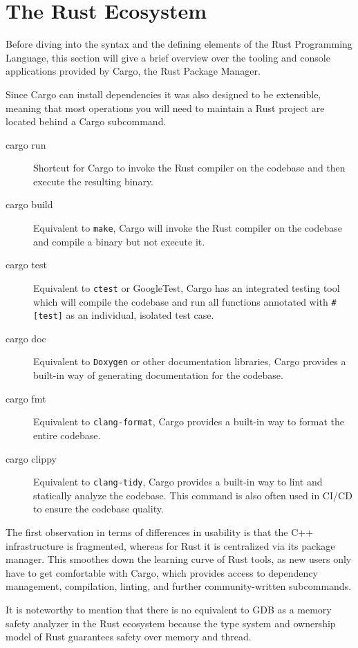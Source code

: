 \documentclass[11pt,
               a4paper,
               bibtotoc,
               idxtotoc,
               headsepline,
               footsepline,
               footexclude,
               BCOR12mm,
               DIV13,
               openany,   %
               ]
               {scrbook}
\begin{document}
\section{The Rust Ecosystem}

Before diving into the syntax and the defining elements of the Rust Programming Language, this section will give a brief overview over the tooling and console applications provided by Cargo, the Rust Package Manager.

Since Cargo can install dependencies it was also designed to be extensible, meaning that most operations you will need to maintain a Rust project are located behind a Cargo subcommand.

\begin{description}
    \item[cargo run] Shortcut for Cargo to invoke the Rust compiler on the codebase and then execute the resulting binary.
    \item[cargo build] Equivalent to \texttt{make}, Cargo will invoke the Rust compiler on the codebase and compile a binary but not execute it.
    \item[cargo test] Equivalent to \texttt{ctest} or GoogleTest, Cargo has an integrated testing tool which will compile the codebase and run all functions annotated with \texttt{\#[test]} as an individual, isolated test case.
    \item[cargo doc] Equivalent to \texttt{Doxygen} or other documentation libraries, Cargo provides a built-in way of generating documentation for the codebase.
    \item[cargo fmt] Equivalent to \texttt{clang-format}, Cargo provides a built-in way to format the entire codebase.
    \item[cargo clippy] Equivalent to \texttt{clang-tidy}, Cargo provides a built-in way to lint and statically analyze the codebase. This command is also often used in CI/CD to ensure the codebase quality.
\end{description}

The first observation in terms of differences in usability is that the C++ infrastructure is fragmented, whereas for Rust it is centralized via its package manager. This smoothes down the learning curve of Rust tools, as new users only have to get comfortable with Cargo, which provides access to dependency management, compilation, linting, and further community-written subcommands.

It is noteworthy to mention that there is no equivalent to GDB as a memory safety analyzer in the Rust ecosystem because the type system and ownership model of Rust guarantees safety over memory and thread.
\end{document}
